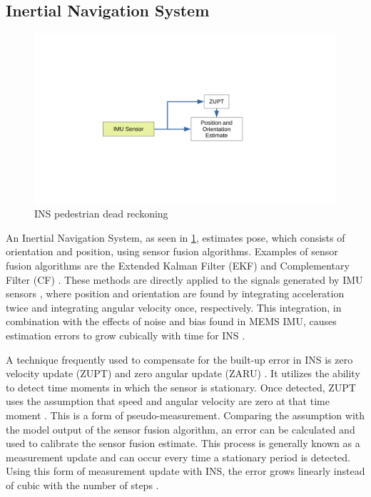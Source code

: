 \subsection{Inertial Navigation System}
\label{sec:INS}
\begin{figure}[]
	\centering
	\includegraphics[trim=80 140 150 80, clip, width=0.8\linewidth]{images/INS_diagram}
	\caption{\ac{INS} pedestrian dead reckoning}
	\label{fig:ins_diagram}
\end{figure}
An Inertial Navigation System, as seen in \cref{fig:ins_diagram}, estimates pose, which consists of orientation and position, using sensor fusion algorithms. Examples of sensor fusion algorithms are the Extended Kalman Filter (EKF) and Complementary Filter (CF) \cite{Kok2017}. These methods are directly applied to the signals generated by  \ac{IMU} sensors \cite{Wu2019}, where position and orientation are found by integrating acceleration twice and integrating angular velocity once, respectively. This integration, in combination with the effects of noise and bias found in MEMS IMU, causes estimation errors to grow cubically with time for INS \cite{Harle2013}.  \par

A technique frequently used to compensate for the built-up error in INS is zero velocity update (ZUPT) and zero angular update (ZARU) \cite{Harle2013}. It utilizes the ability to detect time moments in which the sensor is stationary. Once detected, ZUPT uses the assumption that speed and angular velocity are zero at that time moment \cite{Wu2019,Harle2013}. This is a form of pseudo-measurement. Comparing the assumption with the model output of the sensor fusion algorithm, an error can be calculated and used to calibrate the sensor fusion estimate. This process is generally known as a measurement update and can occur every time a stationary period is detected.  Using this form of measurement update with INS, the error grows linearly instead of cubic with the number of steps \cite{foxlin2005pedestrian}.\par

